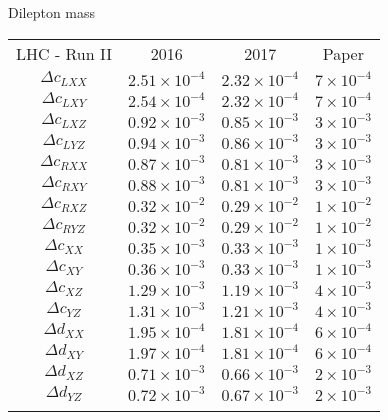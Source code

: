 \documentclass[a4paper,11pt,twoside,french]{article}
\begin{document}
Dilepton mass
\begin{table}[h!]\footnotesize 
    \begin{tabular}{ccc||c}
        \hline\noalign{\smallskip}
         LHC - Run II  &  2016  & 2017 & Paper \\
        \noalign{\smallskip}\hline\noalign{\smallskip}
        $\Delta c_{LXX}$ & $2.51\times 10^{-4}$  & $2.32\times 10^{-4}$&
        $7\times 10^{-4}$ \\
        $\Delta c_{LXY}$ & $2.54\times 10^{-4}$  & $2.32\times 10^{-4}$&
        $7\times 10^{-4}$ \\
        $\Delta c_{LXZ}$ & $0.92\times 10^{-3}$ & $0.85\times 10^{-3}$ &
        $3\times 10^{-3}$\\
        $\Delta c_{LYZ}$ & $0.94\times 10^{-3}$ & $0.86\times 10^{-3}$ &
        $3\times 10^{-3}$\\
        \noalign{\smallskip}\hline\noalign{\smallskip}
        $\Delta c_{RXX}$ & $0.87\times 10^{-3}$  & $0.81\times 10^{-3}$&
         $3\times 10^{-3}$\\
        $\Delta c_{RXY}$ & $0.88\times 10^{-3}$  & $0.81\times 10^{-3}$&
         $3\times 10^{-3}$\\
        $\Delta c_{RXZ}$ & $0.32\times 10^{-2}$ & $0.29\times 10^{-2}$ &
        $1\times 10^{-2}$ \\
        $\Delta c_{RYZ}$ & $0.32\times 10^{-2}$ & $0.29\times 10^{-2}$ &
        $1\times 10^{-2}$ \\
        \noalign{\smallskip}\hline\noalign{\smallskip}
        $\Delta c_{XX}$ & $0.35\times 10^{-3}$  & $0.33\times 10^{-3}$ &
         $1\times 10^{-3}$\\
        $\Delta c_{XY}$ & $0.36\times 10^{-3}$  & $0.33\times 10^{-3}$ &
         $1\times 10^{-3}$\\
        $\Delta c_{XZ}$ & $1.29\times 10^{-3}$ & $1.19\times 10^{-3}$  &
        $4\times 10^{-3}$ \\
        $\Delta c_{YZ}$ & $1.31\times 10^{-3}$ & $1.21\times 10^{-3}$  &
        $4\times 10^{-3}$ \\
        \noalign{\smallskip}\hline\noalign{\smallskip}
        $\Delta d_{XX}$ & $1.95\times 10^{-4}$  & $1.81\times 10^{-4}$ &
        $6\times 10^{-4}$ \\
        $\Delta d_{XY}$ & $1.97\times 10^{-4}$  & $1.81\times 10^{-4}$ &
        $6\times 10^{-4}$ \\
        $\Delta d_{XZ}$ & $0.71\times 10^{-3}$ & $0.66\times 10^{-3}$ &
         $2\times 10^{-3}$\\
        $\Delta d_{YZ}$ & $0.72\times 10^{-3}$ & $0.67\times 10^{-3}$ &
         $2\times 10^{-3}$\\
        \noalign{\smallskip}\hline\vspace{0.1cm}
    \end{tabular}
\end{table}
\end{document}
